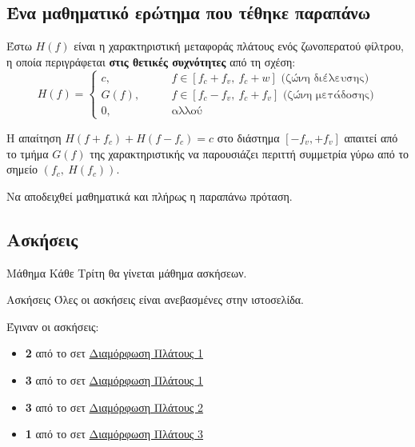 \documentclass[11pt,a4paper,notitlepage,fleqn]{article}
\begin{document}

\subsection{Ένα μαθηματικό ερώτημα που τέθηκε παραπάνω}
\label{sec:interesting-question}
\begin{infobox}{}
	Έστω \( H(f) \) είναι η χαρακτηριστική μεταφοράς πλάτους ενός ζωνοπερατού φίλτρου,
	η οποία περιγράφεται \textbf{στις θετικές συχνότητες} από τη σχέση:
	\[
	H(f) = \begin{cases}
	c, \qquad & f \in \left[ f_c+f_v,\ f_c+w \right]\text{ (ζώνη διέλευσης)} \\
	G(f),\qquad & f\in \left[f_c-f_v,\ f_c+f_v\right]\text{ (ζώνη μετάδοσης)} \\
	0,\qquad & \text{αλλού}
	\end{cases}
	\]
	
	Η απαίτηση \( H(f+f_c) + H(f-f_c) = c \) στο διάστημα \( [-f_v,+f_v] \) απαιτεί από
	το τμήμα \( G(f) \) της χαρακτηριστικής να παρουσιάζει περιττή συμμετρία γύρω από το
	σημείο \( \left(f_c,\ H(f_c)\right) \).
	
	Να αποδειχθεί μαθηματικά και πλήρως η παραπάνω πρόταση.
\end{infobox}

\subsection{Ασκήσεις}
\begin{attnbox}{Μάθημα}
	Κάθε Τρίτη θα γίνεται μάθημα ασκήσεων.
\end{attnbox}
\begin{attnbox}{Ασκήσεις}
	Όλες οι ασκήσεις είναι ανεβασμένες στην ιστοσελίδα.
\end{attnbox}

Έγιναν οι ασκήσεις:
\begin{itemize}
	\item \textbf{2} από το σετ
	\href{https://genesis.ee.auth.gr/dimakis/greek/courses/telesysI/exers/am.pdf}{Διαμόρφωση Πλάτους 1}
	\item \textbf{3} από το σετ
	\href{https://genesis.ee.auth.gr/dimakis/greek/courses/telesysI/exers/am.pdf}{Διαμόρφωση Πλάτους 1}
	
	\item\textbf{3} από το σετ
	\href{https://genesis.ee.auth.gr/dimakis/greek/courses/telesysI/exers/ssb.pdf}{Διαμόρφωση Πλάτους 2}
	
	\item\textbf{1} από το σετ
	\href{https://genesis.ee.auth.gr/dimakis/greek/courses/telesysI/exers/vsb.pdf}{Διαμόρφωση Πλάτους 3}
\end{itemize}
\end{document}
